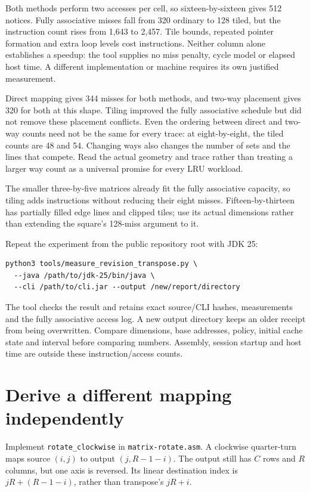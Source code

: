 

Both methods perform two accesses per cell, so sixteen-by-sixteen gives 512
notices. Fully associative misses fall from 320 ordinary to 128 tiled, but the
instruction count rises from 1,643 to 2,457. Tile bounds, repeated pointer formation
and extra loop levels cost instructions. Neither column alone establishes a
speedup: the tool supplies no miss penalty, cycle model or elapsed host time.
A different implementation or machine requires its own justified measurement.

Direct mapping gives 344 misses for both methods, and two-way placement gives
320 for both at this shape. Tiling improved the fully associative schedule but
did not remove these placement conflicts. Even the ordering between direct and
two-way counts need not be the same for every trace: at eight-by-eight, the tiled
counts are 48 and 54. Changing ways also changes the number of sets and the lines
that compete. Read the actual geometry and trace rather than treating a larger
way count as a universal promise for every LRU workload.

The smaller three-by-five matrices already fit the fully associative capacity,
so tiling adds instructions without reducing their eight misses. Fifteen-by-thirteen
has partially filled edge lines and clipped tiles; use its actual dimensions
rather than extending the square's 128-miss argument to it.

Repeat the experiment from the public repository root with JDK 25:
\begin{verbatim}
python3 tools/measure_revision_transpose.py \
  --java /path/to/jdk-25/bin/java \
  --cli /path/to/cli.jar --output /new/report/directory
\end{verbatim}
The tool checks the result and retains exact source/CLI hashes, measurements and
the fully associative access log. A new output directory keeps an older receipt
from being overwritten. Compare dimensions, base addresses, policy, initial cache
state and interval before comparing numbers. Assembly, session startup and host
time are outside these instruction/access counts.

\section{Derive a different mapping independently}

Implement \texttt{rotate\_clockwise} in \texttt{matrix-rotate.asm}. A clockwise
quarter-turn maps source $(i,j)$ to output $(j,R-1-i)$. The output still has
$C$ rows and $R$ columns, but one axis is reversed. Its linear destination index
is $jR+(R-1-i)$, rather than transpose's $jR+i$.

